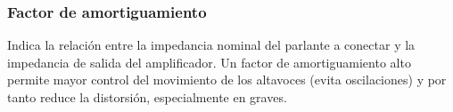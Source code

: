 \subsubsection{Factor de amortiguamiento}

Indica la relación entre la impedancia nominal del parlante a conectar y la impedancia de salida del amplificador. Un factor de amortiguamiento alto permite mayor control del movimiento de los 
altavoces (evita oscilaciones) y por tanto reduce la distorsión, especialmente en graves. 

%	
